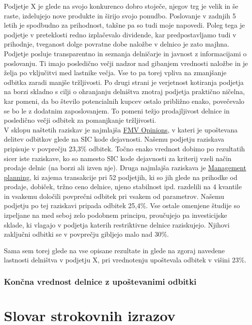 \documentclass[12pt,a4paper]{amsart}
\theoremstyle{definition} %
\theoremstyle{plain} %
\newcommand{\geslo}[2]{\noindent\textbf{#1}\hspace*{3mm}\hangindent=\parindent\hangafter=1 #2}
\begin{document}
\begin{itemize}
Podjetje X je glede na svojo konkurenco dobro stoječe, njegov trg je velik in še raste, izdelujejo nove produkte in širijo svojo ponudbo. Poslovanje v zadnjih 5 letih je spodbudno za prihodnost, takšne pa so tudi moje napovedi. Poleg tega je podjetje v preteklosti redno izplačevalo dividende, kar predpostavljamo tudi v prihodnje, tveganost dolge povratne dobe naložbe v delnico je zato majhna. Podjetje posluje transparentno in seznanja delničarje in javnost z informacijami o poslovanju. Ti imajo posledično večji nadzor nad gibanjem vrednosti naložbe in je želja po vključitvi med lastnike večja. Vse to pa torej vpliva na zmanjšanje odbitka zaradi manjše tržljivosti. Po drugi strani je verjetnost kotiranja podjetja na borzi skladno s cilji o ohranjanju delništva znotraj podjetja praktično ničelna, kar pomeni, da bo število potencialnih kupcev ostalo približno enako, povečevalo se bo le z dodatnim zaposlovanjem. To pomeni težjo prodajljivost delnice in posledično večji odbitek za pomanjkanje tržljivosti.\\
V sklopu naštetih raziskav je najmlajša \underline{FMV Opinions}, v kateri je upoštevana delitev odbitkov glede na SIC kode dejavnosti. Našemu podjetju raziskava pripisuje v povprečju 23,3\% odbitek. Točno enako vrednost dobimo po rezultatih sicer iste raziskave, ko so namesto SIC kode dejavnosti za kriterij vzeli način prodaje delnic (na borzi ali izven nje). Druga najmlajša raziskava je \underline{Management planning}, ki zajema transakcije pri 52 podjetjih, ki so jih glede na prihodke od prodaje, dobiček, tržno ceno delnice, njeno stabilnost ipd. razdelili na 4 kvantile in vsakemu določili povprečni odbitek pri vsakem od parametrov. Našemu podjetju po tej raziskavi pripada odbitek 25,4\%. Vse ostale omenjene študije so izpeljane na med seboj zelo podobnem principu, proučujejo pa investicijske sklade, ki vlagajo v podjetja katerih restriktivne delnice raziskujejo. Njihovi zaključni odbitki se v povprečju gibljejo malo nad 30\%.\par
Sama sem torej glede na vse opisane rezultate in glede na zgoraj navedene lastnosti delništva v podjetju X, pri vrednotenju upoštevala odbitek v višini 23\%.

\subsubsection{Končna vrednost delnice z upoštevanimi odbitki}


\end{itemize}



\section*{Slovar strokovnih izrazov}

%
%


\begin{thebibliography}{99}




\end{thebibliography}
\end{document}
